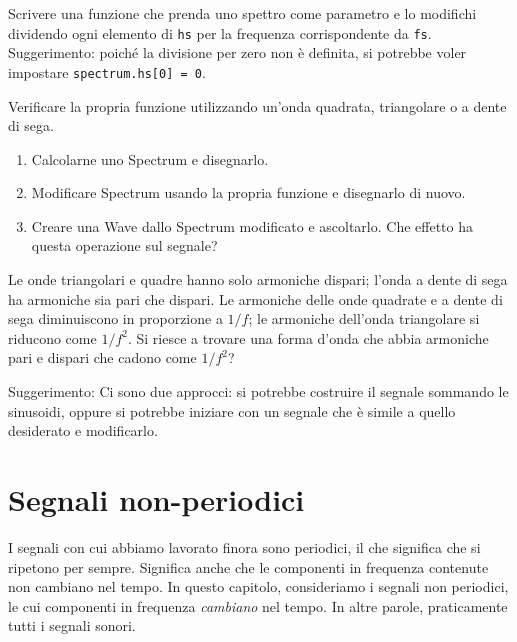 \documentclass[12pt]{book} \usepackage[width=5.5in,height=8.5in, hmarginratio=3:2,vmarginratio=1:1]{geometry}
\begin{document}
\begin{exercise} Scrivere una funzione che prenda uno spettro come parametro e lo modifichi dividendo ogni elemento di {\tt hs} per la frequenza corrispondente da {\tt fs}. Suggerimento: poiché la divisione per zero non è definita, si potrebbe voler impostare {\tt spectrum.hs[0] = 0}.

Verificare la propria funzione utilizzando un'onda quadrata, triangolare o a dente di sega.

\begin{enumerate} 

\item Calcolarne uno Spectrum e disegnarlo.

\item Modificare Spectrum usando la propria funzione e disegnarlo di nuovo.

\item Creare una Wave dallo Spectrum modificato e ascoltarlo. Che effetto ha questa operazione sul segnale?

\end{enumerate} 

\end{exercise} 

\begin{exercise} Le onde triangolari e quadre hanno solo armoniche dispari; l'onda a dente di sega ha armoniche sia pari che dispari. Le armoniche delle onde quadrate e a dente di sega diminuiscono in proporzione a $1/f$; le armoniche dell'onda triangolare si riducono come $1/f^2$. Si riesce a trovare una forma d'onda che abbia armoniche pari e dispari che cadono come $1/f^2$?

Suggerimento: Ci sono due approcci: si potrebbe costruire il segnale sommando le sinusoidi, oppure si potrebbe iniziare con un segnale che è simile a quello desiderato e modificarlo. \end{exercise} 

\chapter{Segnali non-periodici} \label{nonperiodic} 

I segnali con cui abbiamo lavorato finora sono periodici, il che significa che si ripetono per sempre. Significa anche che le componenti in frequenza contenute non cambiano nel tempo. In questo capitolo, consideriamo i segnali non periodici, le cui componenti in frequenza {\em cambiano} nel tempo. In altre parole, praticamente tutti i segnali sonori.
\end{document}
